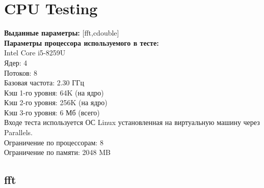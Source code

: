 \section{CPU Testing}
\textbf{Выданные параметры:} [fft,cdouble]\\
\textbf{Параметры процессора используемого в тесте:}\\
{\large Intel Core i5-8259U}\\
Ядер: 4\\
Потоков: 8\\
Базовая частота: 	2.30 ГГц\\
Кэш 1-го уровня: 	64K (на ядро)\\
Кэш 2-го уровня: 	256K (на ядро)\\
Кэш 3-го уровня: 	6 Мб (всего)\\
Входе теста используется ОС Linux установленная на виртуальную машину через Parallels.\\
Ограничение по процессорам: 8\\
Ограничение по памяти: 2048 MB\\
\subsection{fft}
